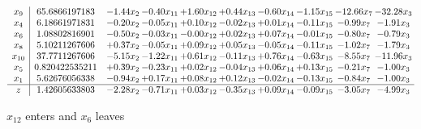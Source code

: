 \documentclass[9pt]{article}
\begin{document}
 \[\begin{array}{c| c c@{\hskip 2pt} c@{\hskip 2pt} c@{\hskip 2pt} c@{\hskip 2pt} c@{\hskip 2pt} c@{\hskip 2pt} c@{\hskip 2pt} c@{\hskip 2pt} }
 x_{9}   &  65.6866197183 & -1.44 x_{2} & -0.40 x_{11} & +  1.60 x_{12} & +  0.44 x_{13} & -0.60 x_{14} & -1.15 x_{15} & -12.66 x_{7} & -32.28 x_{3}\\
 x_{4}   &  6.18661971831 & -0.20 x_{2} & -0.05 x_{11} & +  0.10 x_{12} & -0.02 x_{13} & +  0.01 x_{14} & -0.11 x_{15} & -0.99 x_{7} & -1.91 x_{3}\\
 x_{6}   &  1.08802816901 & -0.50 x_{2} & -0.03 x_{11} & -0.00 x_{12} & +  0.02 x_{13} & +  0.07 x_{14} & -0.01 x_{15} & -0.80 x_{7} & -0.79 x_{3}\\
 x_{8}   &  5.10211267606 & +  0.37 x_{2} & -0.05 x_{11} & +  0.09 x_{12} & +  0.05 x_{13} & -0.05 x_{14} & -0.11 x_{15} & -1.02 x_{7} & -1.79 x_{3}\\
 x_{10}   &  37.7711267606 & -5.15 x_{2} & -1.22 x_{11} & +  0.61 x_{12} & -0.11 x_{13} & +  0.76 x_{14} & -0.63 x_{15} & -8.55 x_{7} & -11.96 x_{3}\\
 x_{5}   &  0.820422535211 & +  0.39 x_{2} & -0.23 x_{11} & +  0.02 x_{12} & -0.04 x_{13} & +  0.06 x_{14} & +  0.13 x_{15} & -0.21 x_{7} & -1.00 x_{3}\\
 x_{1}   &  5.62676056338 & -0.94 x_{2} & +  0.17 x_{11} & +  0.08 x_{12} & +  0.12 x_{13} & -0.02 x_{14} & -0.13 x_{15} & -0.84 x_{7} & -1.00 x_{3}\\
\hline
z    &  1.42605633803 & -2.28 x_{2} & -0.71 x_{11} & +  0.03 x_{12} & -0.35 x_{13} & +  0.09 x_{14} & -0.09 x_{15} & -3.05 x_{7} & -4.99 x_{3}\\
\end{array}\]


 $ x_{12} $ enters and $ x_{6} $ leaves 
\end{document}
